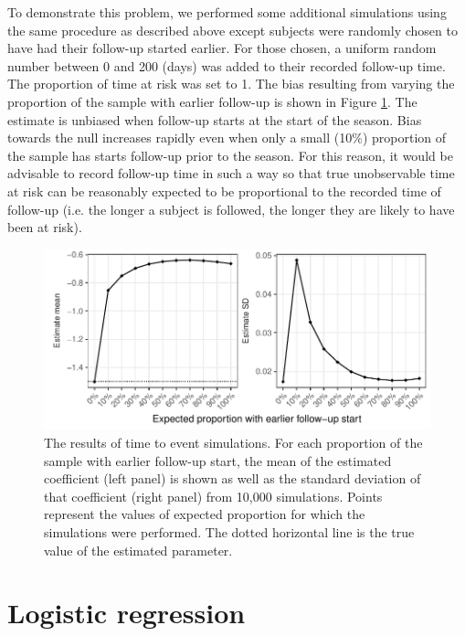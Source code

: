 \documentclass[12pt]{article}
\begin{document}
\pagebreak

To demonstrate this problem, we performed some additional simulations using the same procedure as described above except subjects were randomly chosen to have had their follow-up started earlier. For those chosen, a uniform random number between 0 and 200 (days) was added to their recorded follow-up time. The proportion of time at risk was set to 1. The bias resulting from varying the proportion of the sample with earlier follow-up is shown in Figure \ref{CoxSimLong}. The estimate is unbiased when follow-up starts at the start of the season. Bias towards the null increases rapidly even when only a small (10\%) proportion of the sample has starts follow-up prior to the season. For this reason, it would be advisable to record follow-up time in such a way so that true unobservable time at risk can be reasonably expected to be proportional to the recorded time of follow-up (i.e. the longer a subject is followed, the longer they are likely to have been at risk).

\begin{figure}[htp]
	\centering
	\includegraphics[width=1\textwidth]{../cox-tarprop-plot/long.pdf}
	\caption{
	The results of time to event simulations. For each proportion of the sample with earlier follow-up start, the mean of the estimated coefficient (left panel) is shown as well as the standard deviation of that coefficient (right panel) from 10,000 simulations. Points represent the values of expected proportion for which the simulations were performed. The dotted horizontal line is the true value of the estimated parameter.
	}
	\label{CoxSimLong}
\end{figure}

\pagebreak
\section{Logistic regression}
\end{document}

